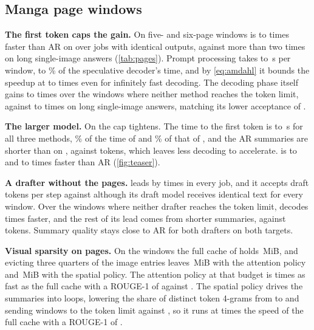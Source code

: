 \subsection{Manga page windows}
\label{sec:pages}



\noindent{}\textbf{The first token caps the gain.} 
On five- and six-page windows \vispec is \tbPagesSpeedMin to \tbPagesSpeedMax times faster than AR on \qwenS over \pagesJobs jobs with identical outputs, against more than two times on long single-image answers (\cref{tab:pages}).
Prompt processing takes \tbPagesTtftMin to \tbPagesTtftMax\,s per window, \tbPagesShareMin to \tbPagesShareMax\% of the speculative decoder's time, and by \cref{eq:amdahl} it bounds the speedup at \tbPagesBoundMin to \tbPagesBoundMax times even for infinitely fast decoding.
The decoding phase itself gains \tbPagesDecodeMin to \tbPagesDecodeMax times over the \tbPagesDecodeN windows where neither method reaches the token limit, against \tbSingleDecodeMin to \tbSingleDecodeMax times on long single-image answers, matching its lower acceptance of \tbPagesAccept.

\noindent{}\textbf{The larger model.} 
On \qwenL the cap tightens.
The time to the first token is \sbPagesTtftMin to \sbPagesTtftMax\,s for all three methods, \sbPagesVisShare\% of the time of \vispec and \sbPagesHivShare\% of that of \hivis, and the AR summaries are shorter than on \qwenS, \sbPagesArLen against \tbPagesLenAr tokens, which leaves less decoding to accelerate.
\vispec is \sbPagesVisSpeedMin to \sbPagesVisSpeedMax and \hivis \sbPagesHivSpeedMin to \sbPagesHivSpeedMax times faster than AR (\cref{fig:teaser}).

\noindent\textbf{A drafter without the pages.}
\hivis leads \vispec by \sbPagesHovMin times in every job, and it accepts \sbPagesHivAccept draft tokens per step against \sbPagesVisAccept although its draft model receives identical text for every window.
Over the \sbPagesHovDecodeN windows where neither drafter reaches the token limit, \hivis decodes \sbPagesHovDecodeMin times faster, and the rest of its lead comes from shorter summaries, \sbPagesHivLen against \sbPagesVisLen tokens.
Summary quality stays close to AR for both drafters on both targets.

\noindent{}\textbf{Visual sparsity on pages.} 
On the windows the full cache of \qwenS holds \spPagesKvFull\,MiB, and evicting three quarters of the image entries leaves \spPagesKvQuarterAttention\,MiB with the attention policy and \spPagesKvQuarterSpatial\,MiB with the spatial policy.
The attention policy at that budget is \spPagesLatQuarterAttention times as fast as the full cache with a ROUGE-1 of \spPagesRougeQuarterAttention against \spPagesRougeRef.
The spatial policy drives the summaries into loops, lowering the share of distinct token 4-grams from \spPagesDistinctRef to \spPagesDistinctQuarterSpatial and sending \spPagesCapQuarterSpatial windows to the token limit against \spPagesCapRef, so it runs at \spPagesLatQuarterSpatial times the speed of the full cache with a ROUGE-1 of \spPagesRougeQuarterSpatial.
